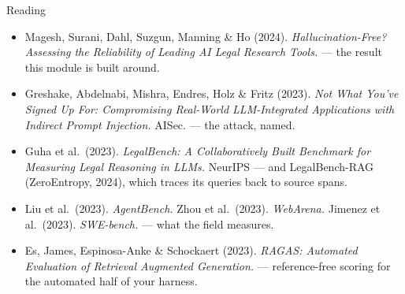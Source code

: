 \begin{frame}{Reading}
\footnotesize
\begin{itemize}
  \item Magesh, Surani, Dahl, Suzgun, Manning \& Ho (2024). \textit{Hallucination-Free? Assessing the Reliability of Leading AI Legal Research Tools.} --- the result this module is built around.
  \pause
  \item Greshake, Abdelnabi, Mishra, Endres, Holz \& Fritz (2023). \textit{Not What You've Signed Up For: Compromising Real-World LLM-Integrated Applications with Indirect Prompt Injection.} AISec. --- the attack, named.
  \pause
  \item Guha et al.\ (2023). \textit{LegalBench: A Collaboratively Built Benchmark for Measuring Legal Reasoning in LLMs.} NeurIPS --- and LegalBench-RAG (ZeroEntropy, 2024), which traces its queries back to source spans.
  \pause
  \item Liu et al.\ (2023). \textit{AgentBench.} \quad Zhou et al.\ (2023). \textit{WebArena.} \quad Jimenez et al.\ (2023). \textit{SWE-bench.} --- what the field measures.
  \pause
  \item Es, James, Espinosa-Anke \& Schockaert (2023). \textit{RAGAS: Automated Evaluation of Retrieval Augmented Generation.} --- reference-free scoring for the automated half of your harness.
\end{itemize}
\end{frame}
